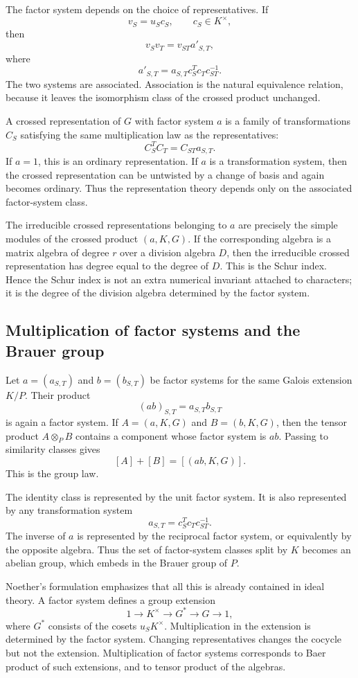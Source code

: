 \documentclass[12pt]{article}
\begin{document}
The factor system depends on the choice of representatives. If
\[
  v_S=u_Sc_S,
  \qquad c_S\in K^{\times},
\]
then
\[
  v_Sv_T=v_{ST}a'_{S,T},
\]
where
\[
  a'_{S,T}=a_{S,T}c_S^Tc_Tc_{ST}^{-1}.
\]
The two systems are associated. Association is the natural equivalence relation, because it leaves the isomorphism class of the crossed product unchanged.

A crossed representation of \(G\) with factor system \(a\) is a family of transformations \(C_S\) satisfying the same multiplication law as the representatives:
\[
  C_S^T C_T=C_{ST}a_{S,T}.
\]
If \(a=1\), this is an ordinary representation. If \(a\) is a transformation system, then the crossed representation can be untwisted by a change of basis and again becomes ordinary. Thus the representation theory depends only on the associated factor-system class.

The irreducible crossed representations belonging to \(a\) are precisely the simple modules of the crossed product \((a,K,G)\). If the corresponding algebra is a matrix algebra of degree \(r\) over a division algebra \(D\), then the irreducible crossed representation has degree equal to the degree of \(D\). This is the Schur index. Hence the Schur index is not an extra numerical invariant attached to characters; it is the degree of the division algebra determined by the factor system.

\subsection{Multiplication of factor systems and the Brauer group}

Let \(a=(a_{S,T})\) and \(b=(b_{S,T})\) be factor systems for the same Galois extension \(K/P\). Their product
\[
  (ab)_{S,T}=a_{S,T}b_{S,T}
\]
is again a factor system. If \(A=(a,K,G)\) and \(B=(b,K,G)\), then the tensor product \(A\otimes_PB\) contains a component whose factor system is \(ab\). Passing to similarity classes gives
\[
  [A]+[B]=[(ab,K,G)].
\]
This is the group law.

The identity class is represented by the unit factor system. It is also represented by any transformation system
\[
  a_{S,T}=c_S^Tc_Tc_{ST}^{-1}.
\]
The inverse of \(a\) is represented by the reciprocal factor system, or equivalently by the opposite algebra. Thus the set of factor-system classes split by \(K\) becomes an abelian group, which embeds in the Brauer group of \(P\).

Noether's formulation emphasizes that all this is already contained in ideal theory. A factor system defines a group extension
\[
  1\longrightarrow K^{\times}\longrightarrow G^*\longrightarrow G\longrightarrow1,
\]
where \(G^*\) consists of the cosets \(u_SK^{\times}\). Multiplication in the extension is determined by the factor system. Changing representatives changes the cocycle but not the extension. Multiplication of factor systems corresponds to Baer product of such extensions, and to tensor product of the algebras.
\end{document}
